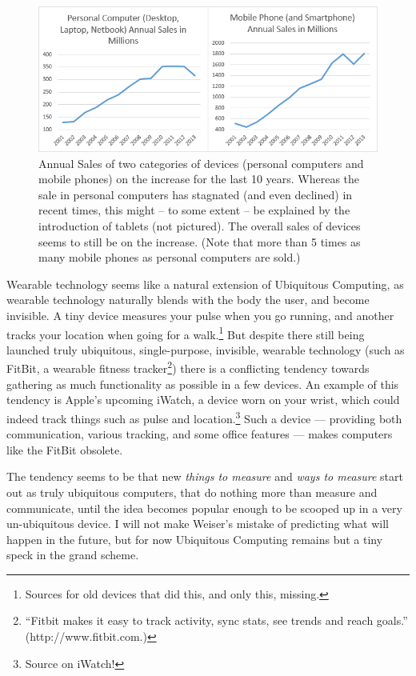 \begin{figure}[htb]
    \centering
    \includegraphics[width=1\textwidth]{multipurpose/actual-sales-graph}
    \caption{Annual Sales of two categories of devices (personal computers and mobile phones) on the increase for the last 10 years.
        Whereas the sale in personal computers has stagnated (and even declined) in recent times, this might -- to some extent -- be
        explained by the introduction of tablets (not pictured). The overall sales of devices seems to still be on the increase. (Note
        that more than 5 times as many mobile phones as personal computers are sold.)\cite{wikipedia-mobiles}\cite{wikipedia-pcs}}
    \label{fig:actual-sales-graph}
\end{figure}

Wearable technology seems like a natural extension of Ubiquitous Computing, as wearable technology naturally blends with the body
the user, and become invisible. A tiny device measures your pulse when you go running, and another tracks your location when going for a
walk.\footnote{Sources for old devices that did this, and only this, missing.} But despite there still being launched truly ubiquitous,
single-purpose, invisible, wearable technology (such as FitBit, a wearable fitness tracker\footnote{``Fitbit makes it easy to track
activity, sync stats, see trends and reach goals.'' (http://www.fitbit.com.)}) there is a conflicting tendency towards gathering as much
functionality as possible in a few devices. An example of this tendency is Apple's upcoming iWatch, a device worn on your wrist, which
could indeed track things such as pulse and location.\footnote{Source on iWatch!} Such a device --- providing both communication,
various tracking, and some office features --- makes computers like the FitBit obsolete.

The tendency seems to be that new \emph{things to measure} and \emph{ways to measure} start out as truly ubiquitous computers, that do
nothing more than measure and communicate, until the idea becomes popular enough to be scooped up in a very un-ubiquitous device. I will
not make Weiser's mistake of predicting what will happen in the future, but for now Ubiquitous Computing remains but a tiny speck in the
grand scheme.

